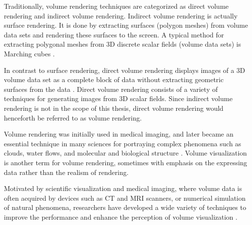 




Traditionally, volume rendering techniques are categorized as direct volume rendering and indirect volume rendering.
Indirect volume rendering is actually surface rendering. It is done by extracting surfaces (polygon meshes) from volume data sets and rendering these surfaces to the screen. A typical method for extracting polygonal meshes from 3D discrete scalar fields (volume data sets) is Marching cubes \cite{lorensen_marching_1987}.

In contrast to surface rendering, direct volume rendering displays images of a 3D volume data set as a complete block of data without extracting geometric surfaces from the data \cite{levoy_display_1988}. Direct volume rendering consists of a variety of techniques for generating images from 3D scalar fields.
Since indirect volume rendering is not in the scope of this thesis, direct volume rendering would henceforth be referred to as volume rendering.

Volume rendering was initially used in medical imaging, and later became an essential technique in many sciences for portraying complex phenomena such as clouds, water flows, and molecular and biological structure \cite{rosenblum_scientific_1994}.
Volume visualization is another term for volume rendering, sometimes with emphasis on the expressing data rather than the realism of rendering.

Motivated by scientific visualization and medical imaging, where volume data is often acquired by devices such as CT and MRI scanners, or numerical simulation of natural phenomena, researchers have developed a wide variety of techniques to improve the performance and enhance the perception of volume visualization \cite{corcoran_enhancing_2013}.

